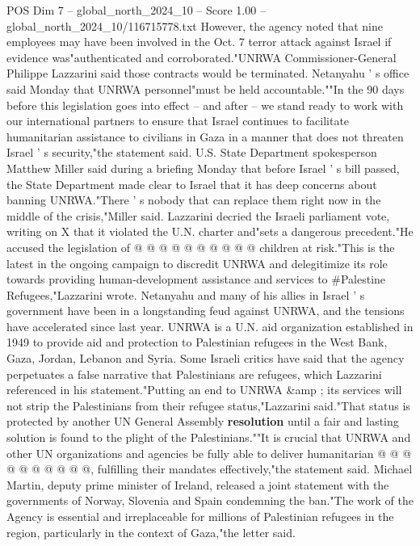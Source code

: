 \begin{textsample}{POS Dim 7 – global\_north\_2024\_10 – Score 1.00 – global\_north\_2024\_10/116715778.txt}  \label{ex:f7_pos_417}
However, the agency noted that nine employees may have been involved in the Oct. 7 terror attack against Israel if evidence was"authenticated and corroborated."UNRWA Commissioner-General Philippe Lazzarini said those contracts would be terminated.
Netanyahu ' s office said Monday that UNRWA personnel"must be held accountable.""In the 90 days before this legislation goes into effect -- and after -- we stand ready to work with our international partners to ensure that Israel continues to facilitate humanitarian assistance to civilians in Gaza in a manner that does not threaten Israel ' s security,"the statement said.
U.S.
State Department spokesperson Matthew Miller said during a briefing Monday that before Israel ' s bill passed, the State Department made clear to Israel that it has deep concerns about banning UNRWA."There ' s nobody that can replace them right now in the middle of the crisis,"Miller said.
Lazzarini decried the Israeli parliament vote, writing on X that it violated the U.N. charter and"sets a dangerous precedent."He accused the legislation of @ @ @ @ @ @ @ @ @ @ children at risk."This is the latest in the ongoing campaign to discredit UNRWA and delegitimize its role towards providing human-development assistance and services to \#Palestine Refugees,"Lazzarini wrote.
Netanyahu and many of his allies in Israel ' s government have been in a longstanding feud against UNRWA, and the tensions have accelerated since last year.
UNRWA is a U.N. aid organization established in 1949 to provide aid and protection to Palestinian refugees in the West Bank, Gaza, Jordan, Lebanon and Syria.
Some Israeli critics have said that the agency perpetuates a false narrative that Palestinians are refugees, which Lazzarini referenced in his statement."Putting an end to UNRWA \&amp ; its services will not strip the Palestinians from their refugee status,"Lazzarini said."That status is protected by another UN General Assembly \textbf{resolution} until a fair and lasting solution is found to the plight of the Palestinians.""It is crucial that UNRWA and other UN organizations and agencies be fully able to deliver humanitarian @ @ @ @ @ @ @ @ @ @, fulfilling their mandates effectively,"the statement said.
Michael Martin, deputy prime minister of Ireland, released a joint statement with the governments of Norway, Slovenia and Spain condemning the ban."The work of the Agency is essential and irreplaceable for millions of Palestinian refugees in the region, particularly in the context of Gaza,"the letter said.

\end{textsample}
